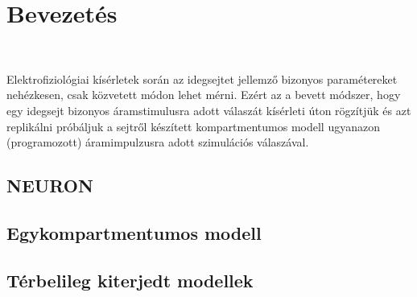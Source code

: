 \section{Bevezetés}
\

Elektrofiziológiai kísérletek során az idegsejtet jellemző bizonyos paramétereket nehézkesen, csak közvetett módon lehet mérni. Ezért az a bevett módszer, hogy egy idegsejt bizonyos áramstimulusra adott válaszát kísérleti úton rögzítjük és azt replikálni próbáljuk a sejtről készített kompartmentumos modell ugyanazon (programozott) áramimpulzusra adott szimulációs válaszával. 

\subsection{NEURON}

\subsection{Egykompartmentumos modell}

\subsection{Térbelileg kiterjedt modellek}